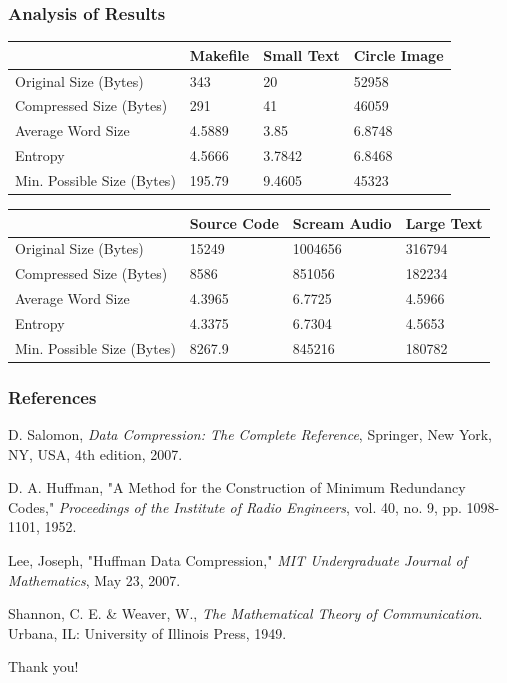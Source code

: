 \documentclass{beamer}
\theoremstyle{definition}
\begin{document}
\begin{frame}

\frametitle{Analysis of Results}

\begin{center}
\begin{tabular}{ | l | l | l | l | }
\hline
 & Makefile & Small Text & Circle Image \\ \hline
Original Size (Bytes) & 343 & 20 & 52958 \\ \hline
Compressed Size (Bytes) & 291 & 41 & 46059 \\ \hline
Average Word Size & 4.5889 & 3.85 & 6.8748 \\ \hline
Entropy & 4.5666 & 3.7842 & 6.8468 \\ \hline
Min. Possible Size (Bytes) & 195.79 & 9.4605 & 45323 \\ \hline
\end{tabular}
\end{center}

\begin{center}
\begin{tabular}{ | l | l | l | l | }
\hline
 & Source Code & Scream Audio & Large Text \\ \hline
Original Size (Bytes) & 15249 & 1004656 & 316794 \\ \hline
Compressed Size (Bytes) & 8586 & 851056 & 182234 \\ \hline
Average Word Size & 4.3965 & 6.7725 & 4.5966 \\ \hline
Entropy & 4.3375 & 6.7304 & 4.5653 \\ \hline
Min. Possible Size (Bytes) & 8267.9 & 845216 & 180782 \\ \hline
\end{tabular}
\end{center}

\end{frame}

\begin{frame}

\frametitle{References}

D. Salomon, \textit{Data Compression: The Complete Reference}, Springer, New York, NY, USA, 4th edition, 2007.
\vspace{.5 cm}

D. A. Huffman, "A Method for the Construction of Minimum Redundancy Codes," \textit{Proceedings of the Institute of Radio Engineers}, vol. 40, no. 9, pp. 1098-1101, 1952.
\vspace{.5 cm}

Lee, Joseph, "Huffman Data Compression," \textit{MIT Undergraduate Journal of Mathematics}, May 23, 2007.
\vspace{.5 cm}

Shannon, C. E. \& Weaver, W., \textit{The Mathematical Theory of Communication}. Urbana, IL: University of Illinois Press, 1949.

\end{frame}

\begin{frame}

\center
\Huge
Thank you!

\end{frame}
\end{document}
